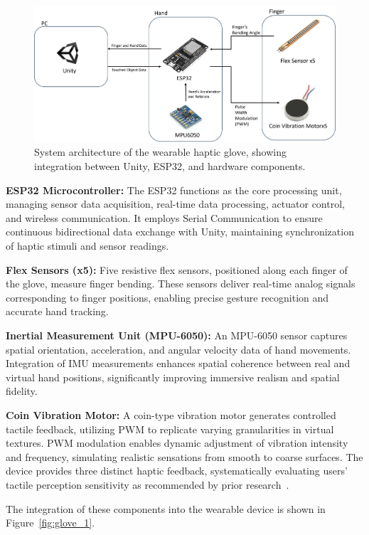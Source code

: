 \documentclass[graybox]{svmult}
\begin{document}
\begin{figure}\centering
	\includegraphics[width=1\textwidth]{figure/system diagram.png}%
	\caption{System architecture of the wearable haptic glove, showing integration between Unity, ESP32, and hardware components.}\label{fig:system_diagram}
\end{figure}
\textbf{ESP32 Microcontroller:}
The ESP32 functions as the core processing unit, managing sensor data acquisition, real-time data processing, actuator control, and wireless communication. It employs Serial Communication to ensure continuous bidirectional data exchange with Unity, maintaining synchronization of haptic stimuli and sensor readings.

\textbf{Flex Sensors (x5):}
Five resistive flex sensors, positioned along each finger of the glove, measure finger bending. These sensors deliver real-time analog signals corresponding to finger positions, enabling precise gesture recognition and accurate hand tracking.

\textbf{Inertial Measurement Unit (MPU-6050):}
An MPU-6050 sensor captures spatial orientation, acceleration, and angular velocity data of hand movements. Integration of IMU measurements enhances spatial coherence between real and virtual hand positions, significantly improving immersive realism and spatial fidelity.

\textbf{Coin Vibration Motor:}
A coin-type vibration motor generates controlled tactile feedback, utilizing PWM to replicate varying granularities in virtual textures. PWM modulation enables dynamic adjustment of vibration intensity and frequency, simulating realistic sensations from smooth to coarse surfaces. The device provides three distinct haptic feedback, systematically evaluating users' tactile perception sensitivity as recommended by prior research~\cite{strohmeier2017generating, bensmaia2003vibrations}.

The integration of these components into the wearable device is shown in Figure~\ref{fig:glove_1}.
\end{document}
